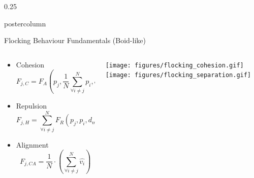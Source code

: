 \documentclass[final,hyperref={pdfpagelabels=false}]{beamer}
\newlength{\columnheight}
\def\colwidth{0.25\linewidth}
\begin{document}
\begin{frame}[fragile]
\begin{columns}[t]
    \begin{column}{\colwidth}
      \begin{beamercolorbox}[center,wd=\textwidth]{postercolumn}
        \begin{minipage}[T]{.98\textwidth} %
          \parbox[t][\columnheight]{\textwidth}{ %
            
\iffalse
            \begin{block}{Flocking Behaviour Fundamentals (Boid-like)}
              \begin{columns}[T]
                \begin{column}{.70 \textwidth}
                  \begin{itemize}
                    \item Cohesion
                      \begin{equation}
                        F_{j,C}= F_A\left(p_j, \frac{1}{N}\sum\limits_{\forall i \ne j}^N{p_i}, d_{max}\right)
                      \end{equation}
                    \item Repulsion
                      \begin{equation}
                        F_{j,H}= \sum\limits_{\forall i \ne j}^N F_R\left(p_j, p_i, d_{max}) \big| d_{max}>\|p_i-p_j\|\right)
                      \end{equation}
                    \item Alignment
                      \begin{equation}
                        F_{j,CA}= \frac{1}{N}\cdot\left(\sum\limits_{\forall i \ne j}^N \hat{v_i}\right) 
                      \end{equation}
                    \end{itemize}
                \end{column}
                \begin{column}{.25\textwidth}
                  \texttt{[image: figures/flocking\_cohesion.gif]}
                  \vspace{\baselineskip}
                  \texttt{[image: figures/flocking\_separation.gif]}

\end{column}
\end{columns}
\end{block}}
\end{minipage}
\end{beamercolorbox}
\end{column}
\end{columns}
\end{frame}
\end{document}
